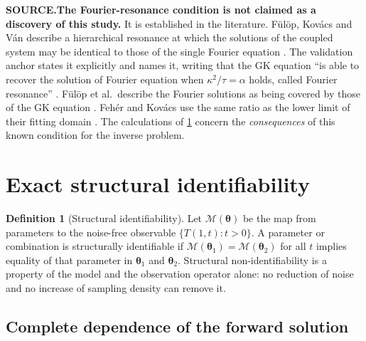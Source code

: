\documentclass[11pt,a4paper]{article}
\theoremstyle{definition}
\newtheorem{definitionx}{Definition}[section]
\newcommand{\source}[1]{\par\smallskip\noindent\textbf{SOURCE.}\enspace #1\par}
\begin{document}
\source{\textbf{The Fourier-resonance condition is not claimed as a discovery
of this study.} It is established in the literature. Fülöp, Kovács and Ván
describe a hierarchical resonance at which the solutions of the coupled system
may be identical to those of the single Fourier equation
\cite{FulopKovacsVan2015}. The validation anchor states it explicitly and names
it, writing that the GK equation ``is able to recover the solution of Fourier
equation when $\kappa^{2}/\tau=\alpha$ holds, called Fourier resonance''
\cite{Kovacs2018}. Fülöp et al.\ describe the Fourier solutions as being
covered by those of the GK equation \cite{Fulop2018entropy}. Feh\'er and
Kov\'acs use the same ratio as the lower limit of their fitting domain
\cite{FeherKovacs2021}. The calculations of \cref{sec:structural} concern the
\emph{consequences} of this known condition for the inverse problem.}

\section{Exact structural identifiability}
\label{sec:structural}

\begin{definitionx}[Structural identifiability]
\label{def:struct}
Let $\mathcal{M}(\bm{\theta})$ be the map from parameters to the noise-free
observable $\{T(1,t):t>0\}$. A parameter or combination is structurally
identifiable if
$\mathcal{M}(\bm{\theta}_{1})=\mathcal{M}(\bm{\theta}_{2})$ for all $t$ implies
equality of that parameter in $\bm{\theta}_{1}$ and $\bm{\theta}_{2}$.
Structural non-identifiability is a property of the model and the observation
operator alone: no reduction of noise and no increase of sampling density can
remove it.
\end{definitionx}

\subsection{Complete dependence of the forward solution}
\end{document}
